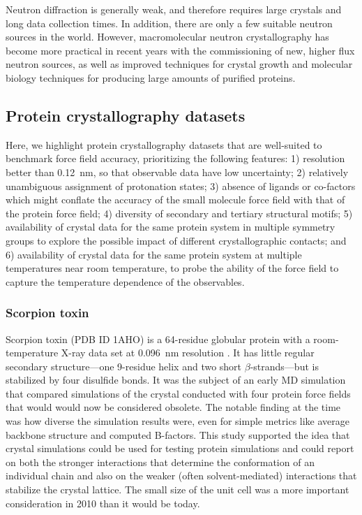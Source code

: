 \documentclass[9pt,review]{livecoms}
\begin{document}
Neutron diffraction is generally weak, and therefore requires large crystals and long data collection times.
In addition, there are only a few suitable neutron sources in the world.
However, macromolecular neutron crystallography has become more practical in recent years with the commissioning of new, higher flux neutron sources, as well as improved techniques for crystal growth and molecular biology techniques for producing large amounts of purified proteins.

\subsection{Protein crystallography datasets}
\label{sub:xtal_data}

Here, we highlight protein crystallography datasets that are well-suited to benchmark force field accuracy, prioritizing the following features: 1) resolution better than \qty{0.12}{\nano\meter}, so that observable data have low uncertainty; 2) relatively unambiguous assignment of protonation states; 3) absence of ligands or co-factors which might conflate the accuracy of the small molecule force field with that of the protein force field; 4) diversity of secondary and tertiary structural motifs; 5) availability of crystal data for the same protein system in multiple symmetry groups to explore the possible impact of different crystallographic contacts; and 6) availability of crystal data for the same protein system at multiple temperatures near room temperature, to probe the ability of the force field to capture the temperature dependence of the observables.


\subsubsection{Scorpion toxin}
\label{sub2:scorption_toxin}

Scorpion toxin (PDB ID 1AHO) is a 64-residue globular protein with a room-temperature X-ray data set at \qty{0.096}{\nano\meter} resolution \cite{smith_ab_1997}.
It has little regular secondary structure---one 9-residue helix and two short $\beta$-strands---but is stabilized by four disulfide bonds.
It was the subject of an early MD simulation \cite{cerutti_simulations_2010} that compared simulations of the crystal conducted with four protein force fields that would would now be considered obsolete.
The notable finding at the time was how diverse the simulation results were, even for simple metrics like average backbone structure and computed B-factors.
This study supported the idea that crystal simulations could be used for testing protein simulations and could report on both the stronger interactions that determine the conformation of an individual chain and also on the weaker (often solvent-mediated) interactions that stabilize the crystal lattice.
The small size of the unit cell was a more important consideration in 2010 than it would be today.
\end{document}
